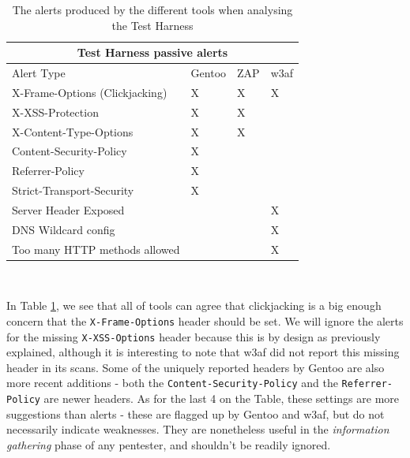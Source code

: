 \begin{table}[h]
	
	{

		\captionsetup{justification=centering}
		
		\caption{The alerts produced by the different tools when analysing the Test Harness}
		\label{table:test_harness_alerts}
		\begin{tabular}{ |p{7cm}|>{\centering\arraybackslash}m{2cm} |>{\centering\arraybackslash}m{2cm} |>{\centering\arraybackslash}m{2cm}| }
			\hline
			\multicolumn{4}{|c|}{\textbf{Test Harness passive alerts}} \\ [0.5ex]
			\hline \hline 
			Alert Type & Gentoo & ZAP & w3af \\
			\hline
			X-Frame-Options (Clickjacking) & X & X & X \\
			X-XSS-Protection & X & X & \\
			X-Content-Type-Options& X & X & \\
			Content-Security-Policy & X & & \\
			Referrer-Policy & X & & \\
			Strict-Transport-Security & X  & & \\
			Server Header Exposed & & & X\\
			DNS Wildcard config & & & X \\
			Too many HTTP methods allowed & & & X\\
			
			\hline
		\end{tabular}
	} \\
\end{table}

In Table \ref{table:test_harness_alerts}, we see that all of tools can agree that clickjacking is a big enough concern that the \texttt{X-Frame-Options} header should be set. We will ignore the alerts for the missing \texttt{X-XSS-Options} header because this is by design as previously explained, although it is interesting to note that w3af did not report this missing header in its scans. Some of the uniquely reported headers by Gentoo are also more recent additions - both the \texttt{Content-Security-Policy} and the \texttt{Referrer-Policy} are newer headers. As for the last 4 on the Table, these settings are more suggestions than alerts - these are flagged up by Gentoo and w3af, but do not necessarily indicate weaknesses. They are nonetheless useful in the \textit{information gathering} phase of any pentester, and shouldn't be readily ignored. \\ 

